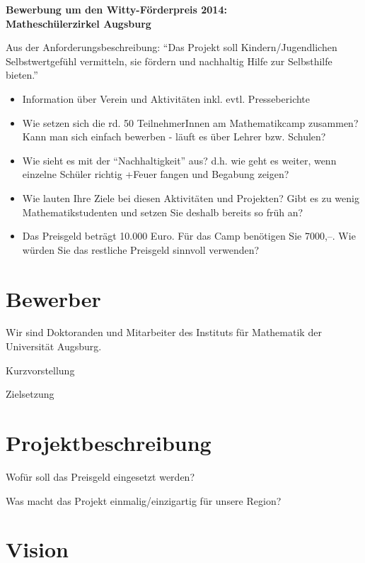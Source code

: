 \documentclass[12pt]{zettel}
\begin{document}
\renewcommand{\betreff}{}

\makeletterhead{}

\vspace{-2em}

\begin{center}
  \Large\textbf{\textsf{Bewerbung um den Witty-Förderpreis 2014: \\
  Matheschülerzirkel Augsburg }}
\end{center}

Aus der Anforderungsbeschreibung: "`Das Projekt soll
Kindern/Jugendlichen Selbstwertgefühl vermitteln, sie fördern und nachhaltig
Hilfe zur Selbsthilfe bieten."'

\begin{itemize}
\item Information über Verein und Aktivitäten inkl. evtl. Presseberichte
\item Wie setzen sich die rd. 50 TeilnehmerInnen am Mathematikcamp zusammen? Kann
man sich einfach bewerben - läuft es über Lehrer bzw. Schulen?
\item Wie sieht es mit der "`Nachhaltigkeit"' aus? d.h. wie geht es weiter, wenn
einzelne Schüler richtig +Feuer fangen und Begabung zeigen?
\item Wie lauten Ihre Ziele bei diesen Aktivitäten und Projekten? Gibt es zu
wenig Mathematikstudenten und setzen Sie deshalb bereits so früh an?
\item Das Preisgeld beträgt 10.000 Euro. Für das Camp benötigen Sie 7000,--. Wie
würden Sie das restliche Preisgeld sinnvoll verwenden?
\end{itemize}

\section{Bewerber}

Wir sind Doktoranden und Mitarbeiter des Instituts für Mathematik der
Universität Augsburg.

Kurzvorstellung

Zielsetzung


\section{Projektbeschreibung}

Wofür soll das Preisgeld eingesetzt werden?

Was macht das Projekt einmalig/einzigartig für unsere Region?


\section{Vision}
\end{document}
